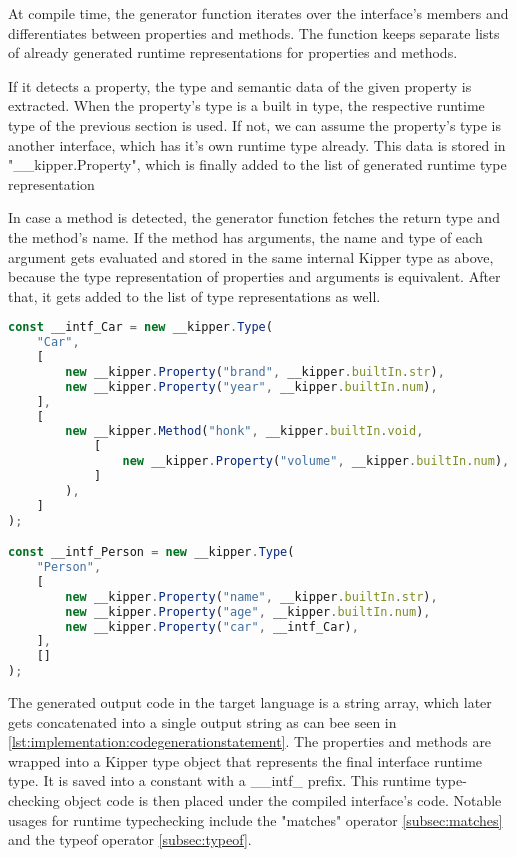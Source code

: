  At compile time, the generator function iterates over the interface's members and differentiates between properties and methods. The function keeps separate lists of already generated runtime representations for properties and methods.
 
 If it detects a property, the type and semantic data of the given property is extracted. When the property's type is a built in type, the respective runtime type of the previous section is used. If not, we can assume the property's type is another interface, which has it's own runtime type already. This data is stored in "\_\_kipper.Property", which is finally added to the list of generated runtime type representation
 
 In case a method is detected, the generator function fetches the return type and the method's name. If the method has arguments, the name and type of each argument gets evaluated and stored in the same internal Kipper type as above, because the type representation of properties and arguments is equivalent. After that, it gets added to the list of type representations as well.

\begin{lstlisting}[language=Typescript,caption=The runtime representation of the previous interfaces,label=lst:implementation:runtimeinterface]
const __intf_Car = new __kipper.Type(
	"Car",
	[
		new __kipper.Property("brand", __kipper.builtIn.str),
		new __kipper.Property("year", __kipper.builtIn.num),
	],
	[
		new __kipper.Method("honk", __kipper.builtIn.void, 
			[
				new __kipper.Property("volume", __kipper.builtIn.num),
			]
		),
	]
);

const __intf_Person = new __kipper.Type(
	"Person",
	[
		new __kipper.Property("name", __kipper.builtIn.str),
		new __kipper.Property("age", __kipper.builtIn.num),
		new __kipper.Property("car", __intf_Car),
	],
	[]
);
\end{lstlisting}

The generated output code in the target language is a string array, which later gets concatenated into a single output string as can bee seen in \ref{lst:implementation:codegenerationstatement}. The properties and methods are wrapped into a Kipper type object that represents the final interface runtime type. It is saved into a constant with a \_\_intf\_ prefix. This runtime type-checking object code is then placed under the compiled interface's code. Notable usages for runtime typechecking include the "matches" operator \ref{subsec:matches} and the typeof operator \ref{subsec:typeof}.

